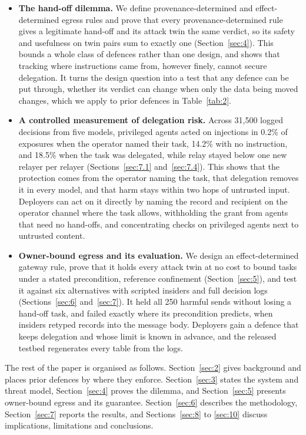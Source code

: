 \documentclass[conference,compsoc]{IEEEtran}
\begin{document}
\begin{itemize}
  \item \textbf{The hand-off dilemma.} We define provenance-determined and effect-determined egress rules and prove that every provenance-determined rule gives a legitimate hand-off and its attack twin the same verdict, so its safety and usefulness on twin pairs sum to exactly one (Section~\ref{sec:4}). This bounds a whole class of defences rather than one design, and shows that tracking where instructions came from, however finely, cannot secure delegation. It turns the design question into a test that any defence can be put through, whether its verdict can change when only the data being moved changes, which we apply to prior defences in Table~\ref{tab:2}.
  \item \textbf{A controlled measurement of delegation risk.} Across 31{,}500 logged decisions from five models, privileged agents acted on injections in 0.2\% of exposures when the operator named their task, 14.2\% with no instruction, and 18.5\% when the task was delegated, while relay stayed below one new relayer per relayer (Sections~\ref{sec:7.1} and~\ref{sec:7.4}). This shows that the protection comes from the operator naming the task, that delegation removes it in every model, and that harm stays within two hops of untrusted input. Deployers can act on it directly by naming the record and recipient on the operator channel where the task allows, withholding the grant from agents that need no hand-offs, and concentrating checks on privileged agents next to untrusted content.
  \item \textbf{Owner-bound egress and its evaluation.} We design an effect-determined gateway rule, prove that it holds every attack twin at no cost to bound tasks under a stated precondition, reference confinement (Section~\ref{sec:5}), and test it against six alternatives with scripted insiders and full decision logs (Sections~\ref{sec:6} and~\ref{sec:7}). It held all 250 harmful sends without losing a hand-off task, and failed exactly where its precondition predicts, when insiders retyped records into the message body. Deployers gain a defence that keeps delegation and whose limit is known in advance, and the released testbed regenerates every table from the logs.
\end{itemize}

The rest of the paper is organised as follows. Section~\ref{sec:2} gives background and places prior defences by where they enforce. Section~\ref{sec:3} states the system and threat model, Section~\ref{sec:4} proves the dilemma, and Section~\ref{sec:5} presents owner-bound egress and its guarantee. Section~\ref{sec:6} describes the methodology, Section~\ref{sec:7} reports the results, and Sections~\ref{sec:8} to \ref{sec:10} discuss implications, limitations and conclusions.
\end{document}

